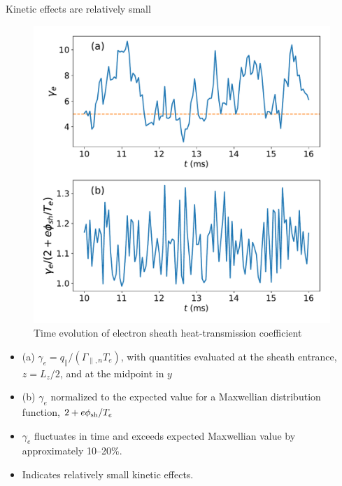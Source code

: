 \documentclass[12pt,table]{beamer}
\begin{document}
\begin{frame}{Kinetic effects are relatively small}
    \begin{minipage}{.5\linewidth}
    \vspace{.5cm}
        \begin{figure}
            \centering
            \includegraphics[width=\linewidth]{figs/heat-coef-sw.pdf}
            \caption{Time evolution of electron sheath heat-transmission coefficient}
            \label{fig:my_label}
        \end{figure}
    \end{minipage}%
    \begin{minipage}{.5\linewidth}
    \begin{itemize} \footnotesize
        \item (a) $\gamma_e = q_\parallel/(\Gamma_{\parallel,n} T_e)$, with quantities evaluated at the sheath entrance, $z=L_z/2$, and at the midpoint in $y$
        \item (b) $\gamma_e$ normalized to the expected value for a Maxwellian distribution function, $2 + e\phi_{\rm sh}/T_e$
        \item $\gamma_e$ fluctuates in time and exceeds expected Maxwellian value by approximately 10--20\%.
        \item Indicates relatively small kinetic effects.
    \end{itemize}
    \end{minipage}
\end{frame}
\end{document}
